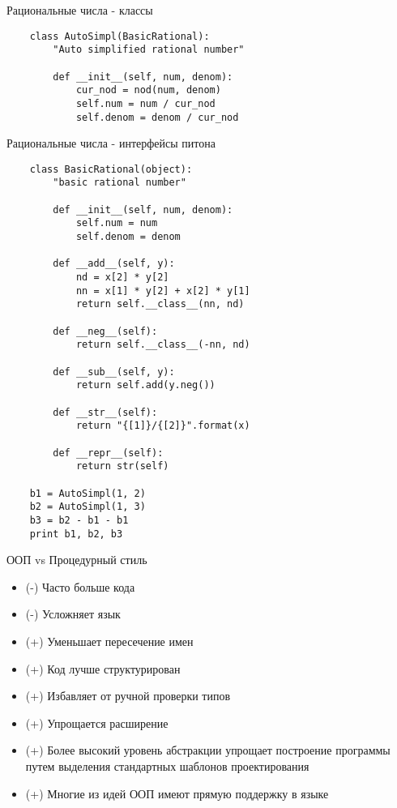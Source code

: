 \documentclass{article}
\begin{document}
\begin{center} Рациональные числа - классы \end{center}
\begin{lstlisting}
    class AutoSimpl(BasicRational):
        "Auto simplified rational number"
    
        def __init__(self, num, denom):
            cur_nod = nod(num, denom)
            self.num = num / cur_nod
            self.denom = denom / cur_nod
\end{lstlisting}
\newpage

\begin{center} Рациональные числа - интерфейсы питона \end{center}
\begin{lstlisting}
    class BasicRational(object):
        "basic rational number"

        def __init__(self, num, denom):
            self.num = num
            self.denom = denom

        def __add__(self, y):
            nd = x[2] * y[2]
            nn = x[1] * y[2] + x[2] * y[1]
            return self.__class__(nn, nd)

        def __neg__(self):
            return self.__class__(-nn, nd)

        def __sub__(self, y):
            return self.add(y.neg())

        def __str__(self):
            return "{[1]}/{[2]}".format(x)

        def __repr__(self):
            return str(self)

    b1 = AutoSimpl(1, 2)
    b2 = AutoSimpl(1, 3)
    b3 = b2 - b1 - b1
    print b1, b2, b3

\end{lstlisting}
\newpage

\begin{center} ООП vs Процедурный стиль \end{center}
\begin{itemize}
    \item (-) Часто больше кода
    \item (-) Усложняет язык
    \item (+) Уменьшает пересечение имен
    \item (+) Код лучше структурирован
    \item (+) Избавляет от ручной проверки типов
    \item (+) Упрощается расширение
    \item (+) Более высокий уровень абстракции упрощает построение программы
              путем выделения стандартных шаблонов проектирования
    \item (+) Многие из идей ООП имеют прямую поддержку в языке
\end{itemize}
\newpage
\end{document}
